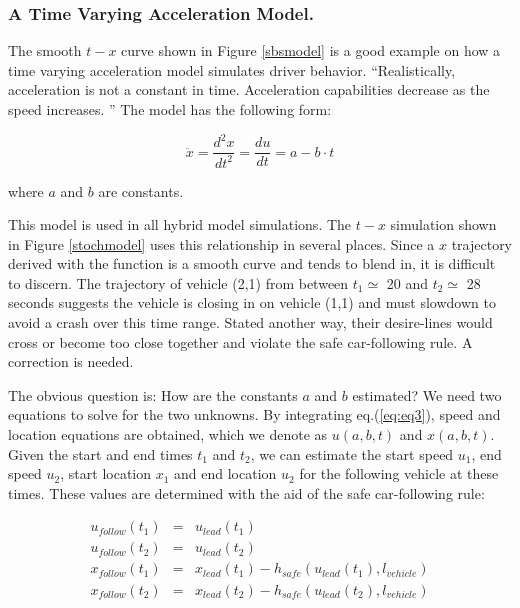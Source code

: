 \documentclass[Proceedings]{ascelike}
\begin{document}
\subsubsection{A Time Varying Acceleration Model.}

The smooth $t-x$ curve shown in Figure \ref{sbsmodel} is a good example on how a time varying acceleration model simulates driver behavior.  ``Realistically, acceleration is not a constant in time. Acceleration capabilities decrease as the speed increases. \cite{LiliBook}''  The model has the following form:

\begin {equation}
 \ddot{x} = \frac{d^2x}{dt^2} = \frac{du}{dt} =  a - b \cdot t \label{eq:eq3}
\end{equation}

\noindent where $a$ and $b$ are constants. 

This model is used in all hybrid model simulations. The $t-x$ simulation shown in Figure \ref{stochmodel} uses this relationship in several places. Since a $x$ trajectory derived with the function is a smooth curve and tends to blend in, it is difficult to discern.  The trajectory of vehicle (2,1) from between $t_1 \simeq$ 20 and $t_2 \simeq$ 28 seconds suggests the vehicle is closing in on vehicle (1,1) and must slowdown to avoid a crash over this time range. Stated another way, their desire-lines would cross or become too close together and violate the safe car-following rule. A correction is needed.

The obvious question is: How  are the constants $a$ and $b$ estimated? We need two equations to solve for the two unknowns. By integrating eq.(\ref{eq:eq3}), speed and location equations are obtained, which we denote as $u(a,b,t)$ and $x(a,b,t)$. Given the start and end times $t_1$ and $t_2$, we can estimate the start speed $u_1$, end speed $u_2$, start location $x_1$ and end location $u_2$ for the following vehicle at these times. These values are determined with the aid of the safe car-following rule:

\begin{eqnarray} 
u_{follow}(t_1) &=& u_{lead}(t_1) \\
u_{follow}(t_2) &=& u_{lead}(t_2) \\
x_{follow}(t_1) &=& x_{lead}(t_1) - h_{safe}(u_{lead}(t_1), l_{vehicle}) \\
x_{follow}(t_2) &=& x_{lead}(t_2) - h_{safe}(u_{lead}(t_2), l_{vehicle})  
\end{eqnarray}
\end{document}
